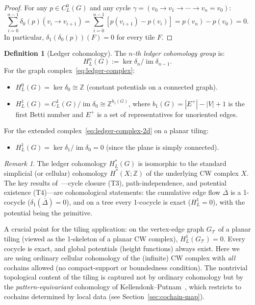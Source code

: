\documentclass[12pt]{article}
\theoremstyle{definition}
\newtheorem{definition}[theorem]{Definition}
\theoremstyle{remark}
\newtheorem{remark}[theorem]{Remark}
\newcommand{\ZZ}{\mathbb{Z}}
\DeclareMathOperator{\im}{im}
\begin{document}
\begin{proof}
For any $p \in C^0_L(G)$ and any cycle $\gamma = (v_0 \to v_1 \to \cdots \to v_n = v_0)$:
\[
\sum_{i=0}^{n-1} \delta_0(p)(v_i \to v_{i+1}) = \sum_{i=0}^{n-1} [p(v_{i+1}) - p(v_i)] = p(v_n) - p(v_0) = 0.
\]
In particular, $\delta_1(\delta_0(p))(F) = 0$ for every tile $F$. \qedhere
\end{proof}

\begin{definition}[Ledger cohomology]
The \emph{$n$-th ledger cohomology group} is:
\begin{equation}
H^n_L(G) := \ker \delta_n / \im \delta_{n-1}.
\end{equation}
For the graph complex~\eqref{eq:ledger-complex}:
\begin{itemize}
\item $H^0_L(G) = \ker \delta_0 \cong \ZZ$ (constant potentials on a connected graph).
\item $H^1_L(G) = C^1_L(G) / \im \delta_0 \cong \ZZ^{b_1(G)}$, where $b_1(G) = |E^+| - |V| + 1$ is the first Betti number and $E^+$ is a set of representatives for unoriented edges.
\end{itemize}
For the extended complex~\eqref{eq:ledger-complex-2d} on a planar tiling:
\begin{itemize}
\item $H^1_L(G) = \ker \delta_1 / \im \delta_0 = 0$ (since the plane is simply connected).
\end{itemize}
\end{definition}

\begin{remark}
The ledger cohomology $H^*_L(G)$ is isomorphic to the standard simplicial (or cellular) cohomology $H^*(X; \ZZ)$ of the underlying CW complex $X$. The key results of~\cite{PardoGuerraEtAl2026}---cycle closure (T3), path-independence, and potential existence (T4)---are cohomological statements: the cumulative edge flow $\overline{\Delta}$ is a 1-cocycle ($\delta_1(\overline{\Delta}) = 0$), and on a tree every 1-cocycle is exact ($H^1_L = 0$), with the potential being the primitive.

A crucial point for the tiling application: on the vertex-edge graph $G_{\mathcal{T}}$ of a planar tiling (viewed as the 1-skeleton of a planar CW complex), $H^1_L(G_{\mathcal{T}}) = 0$. Every cocycle is exact, and global potentials (height functions) always exist. Here we are using ordinary cellular cohomology of the (infinite) CW complex with \emph{all} cochains allowed (no compact-support or boundedness condition). The nontrivial topological content of the tiling is captured not by ordinary cohomology but by the \emph{pattern-equivariant} cohomology of Kellendonk--Putnam~\cite{KellendonkPutnam2006}, which restricts to cochains determined by local data (see Section~\ref{sec:cochain-map}).
\end{remark}
\end{document}
